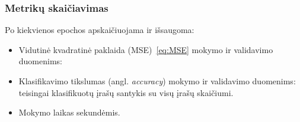 \subsubsection{Metrikų skaičiavimas}
\label{subsubsec:metriku_skaiciavimas}

Po kiekvienos epochos apskaičiuojama ir išsaugoma:
\begin{itemize}
    \item Vidutinė kvadratinė paklaida (MSE)~\eqref{eq:MSE} mokymo ir validavimo duomenims: 
    \item Klasifikavimo tikslumas (angl. \textit{accuracy}) mokymo ir validavimo duomenims: teisingai klasifikuotų įrašų santykis su visų įrašų skaičiumi.
    \item Mokymo laikas sekundėmis.
\end{itemize}